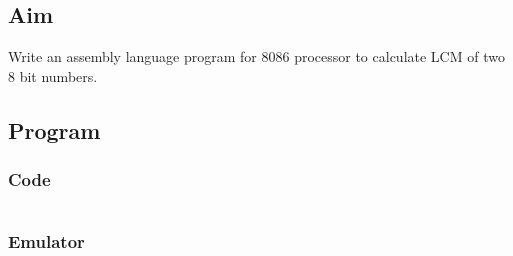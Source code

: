 \documentclass{article}
\begin{document}
\subsection{Aim}
Write an assembly language program for 8086 processor to calculate LCM of two 8 bit numbers.

\subsection{Program}
\subsubsection{Code}
\inputminted{nasm}{"C:/Users/aadit/Documents/BTech/5th Semester/MC Lab/8086 Pgrm 2/2C/LCM.asm"}

\subsubsection{Emulator}
\end{document}
